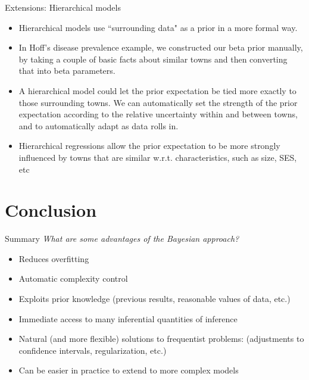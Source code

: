 \documentclass[10pt]{beamer}
\begin{document}
\begin{frame}{Extensions: Hierarchical models}

\begin{itemize}
\item Hierarchical models use ``surrounding data" as a prior in a more formal way.   
\item In Hoff's disease prevalence example,  we constructed our beta prior manually,  by taking a couple of basic facts about similar towns and then converting that into beta parameters.    
\item A hierarchical model could let the prior expectation be tied more exactly to those surrounding towns.   We can automatically set the strength of the prior expectation according to the relative uncertainty within and between towns,  and to automatically adapt as data rolls in. 
\item Hierarchical regressions allow the prior expectation to be more strongly influenced by towns that are similar w.r.t.  characteristics,  such as size,  SES,  etc
\end{itemize}
\end{frame}


\section{Conclusion}

\begin{frame}{Summary}
\textit{What are some advantages of the Bayesian approach?} \pause 
\begin{itemize}
\item Reduces overfitting \pause
\item Automatic complexity control \pause 
\item Exploits prior knowledge {\tiny (previous results, reasonable values of data, etc.)} \pause 
\item Immediate access to many inferential quantities of inference \pause 
\item Natural (and more flexible) solutions to frequentist problems:  {\tiny (adjustments to confidence intervals, regularization, etc.) }  \pause 
\item Can be easier in practice to extend to more complex models 
\end{itemize}
	
\end{frame}
\end{document}
